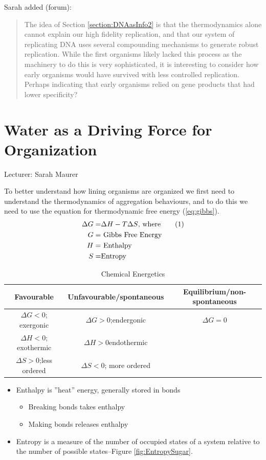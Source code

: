 \documentclass[]{article}
\newcommand\numberthis{\addtocounter{equation}{1}\tag{\theequation}}
\begin{document}
Sarah added (forum):
\begin{quote}
	The idea of Section \ref{section:DNAasInfo2} is that the thermodynamics alone cannot explain our high fidelity replication, and that our system of replicating DNA uses several compounding mechanisms to generate robust replication. While the first organisms likely lacked this process as the machinery to do this is very sophisticated, it is interesting to consider how early organisms would have survived with less controlled replication. Perhaps indicating that early organisms relied on gene products that had lower specificity?
\end{quote}

\section{Water as a Driving Force for Organization}

Lecturer: Sarah Maurer

To better understand how lining organisms are organized we first need to understand the thermodynamics of aggregation behaviours, and to do this we need to use the equation for thermodynamic free energy (\ref{eq:gibbs}).
\begin{align*}
	\Delta G =& \Delta H - T \Delta S \text{, where}\numberthis \label{eq:gibbs}\\
	G =& \text{ Gibbs Free Energy}\\
	H =& \text{ Enthalpy}\\
	S =& \text{Entropy}
\end{align*}

\begin{table}[H]
	\begin{center}
		\caption{Chemical Energetics}\label{tab:chemical:energetics}
		\begin{tabular}[pos]{|c|c|c|}\hline
			Favourable&Unfavourable/spontaneous&Equilibrium/non-spontaneous\\\hline
			$\Delta G<0$; exergonic&$\Delta G>0$;endergonic&$\Delta G=0$\\\hline
			$\Delta H<0$; exothermic&$\Delta H>0$endothermic&\\\hline
			$\Delta S>0$;less ordered&$\Delta S<0$; more ordered&\\\hline
		\end{tabular}
	\end{center}
\end{table}


\begin{itemize}
	\item  Enthalpy is ”heat” energy, generally stored in bonds
	\begin{itemize}
		\item Breaking bonds takes enthalpy
		\item Making bonds releases enthalpy
	\end{itemize}
	\item Entropy is a measure of the number of occupied states of a system relative to the number of possible	states--Figure \ref{fig:EntropySugar}.
\end{itemize}
\end{document}
